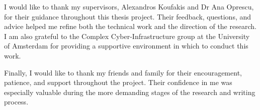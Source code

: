 I would like to thank my supervisors, Alexandros Koufakis and Dr Ana Oprescu, for their guidance throughout this thesis project. Their feedback, questions, and advice helped me refine both the technical work and the direction of the research. I am also grateful to the Complex Cyber-Infrastructure group at the University of Amsterdam for providing a supportive environment in which to conduct this work.

Finally, I would like to thank my friends and family for their encouragement, patience, and support throughout the project. Their confidence in me was especially valuable during the more demanding stages of the research and writing process.
